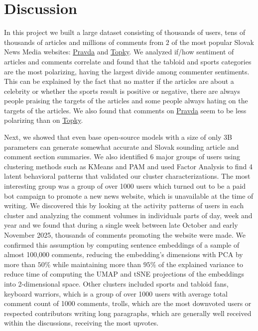 \documentclass[11pt,a4paper]{article}
\def\topky{\href{https://topky.sk}{Topky}}
\def\pravda{\href{https://pravda.sk}{Pravda}}
\begin{document}
\section{Discussion}
In this project we built a large dataset consisting of thousands of users, tens of thousands of articles and millions of comments from $2$ of the most popular Slovak News Media websites: \pravda{} and \topky{}. We analyzed if/how sentiment of articles and comments correlate and found that the tabloid and sports categories are the most polarizing, having the largest divide among commenter sentiments. This can be explained by the fact that no matter if the articles are about a celebrity or whether the sports result is positive or negative, there are always people praising the targets of the articles and some people always hating on the targets of the articles. We also found that comments on \pravda{} seem to be less polarizing than on \topky{}.

Next, we showed that even base open-source models with a size of only 3B parameters can generate somewhat accurate and Slovak sounding article and comment section summaries. We also identified 6 major groups of users using clustering methods such as KMeans \cite{Hartigan1979} and PAM \cite{Rousseeuw1987} and used Factor Analysis \cite{Spearman1904} to find 4 latent behavioral patterns that validated our cluster characterizations. The most interesting group was a group of over 1000 users which turned out to be a paid bot campaign to promote a new news website, which is unavailable at the time of writing. We discovered this by looking at the activity patterns of users in each cluster and analyzing the comment volumes in individuals parts of day, week and year and we found that during a single week between late October and early November 2025, thousands of comments promoting the website were made. We confirmed this assumption by computing sentence embeddings of a sample of almost 100,000 comments, reducing the embedding's dimensions with PCA \cite{Pearson1901} by more than $50\%$ while maintaining more than $95\%$ of the explained variance to reduce time of computing the UMAP \cite{McInnes2020} and tSNE \cite{Maaten2008} projections of the embeddings into 2-dimensional space. Other clusters included sports and tabloid fans, keyboard warriors, which is a group of over 1000 users with average total comment count of 1000 comments, trolls, which are the most downvoted users or respected contributors writing long paragraphs, which are generally well received within the discussions, receiving the most upvotes.
\end{document}
